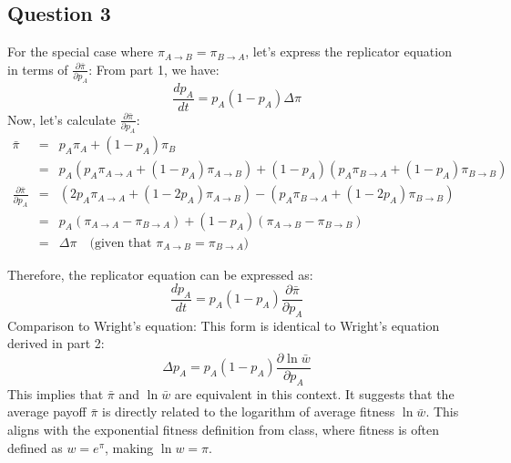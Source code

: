 \documentclass{article}
\begin{document}
\subsection{Question 3}
For the special case where \(\pi_{A \to B} = \pi_{B \to A}\), let's express the replicator equation in terms of \(\frac{\partial \bar{\pi}}{\partial p_A}\):
From part 1, we have:
\[
\frac{dp_A}{dt} = p_A(1-p_A)\Delta\pi
\]
Now, let's calculate \(\frac{\partial \bar{\pi}}{\partial p_A}\):
\[
\begin{array}{rcl}
\bar{\pi} & = & p_A\pi_A + (1-p_A)\pi_B \\
& = & p_A(p_A\pi_{A \to A} + (1-p_A)\pi_{A \to B}) + (1-p_A)(p_A\pi_{B \to A} + (1-p_A)\pi_{B \to B}) \\
\frac{\partial \bar{\pi}}{\partial p_A} & = & (2p_A\pi_{A \to A} + (1-2p_A)\pi_{A \to B}) - (p_A\pi_{B \to A} + (1-2p_A)\pi_{B \to B}) \\
& = & p_A(\pi_{A \to A} - \pi_{B \to A}) + (1-p_A)(\pi_{A \to B} - \pi_{B \to B}) \\
& = & \Delta\pi \quad \text{(given that \(\pi_{A \to B} = \pi_{B \to A}\))}
\end{array}
\]

Therefore, the replicator equation can be expressed as:
\[
\frac{dp_A}{dt} = p_A(1-p_A)\frac{\partial \bar{\pi}}{\partial p_A}
\]
Comparison to Wright's equation:
This form is identical to Wright's equation derived in part 2:
\[
\Delta p_A = p_A(1-p_A)\frac{\partial \ln \bar{w}}{\partial p_A}
\]
This implies that \(\bar{\pi}\) and \(\ln \bar{w}\) are equivalent in this context. It suggests that the average payoff \(\bar{\pi}\) is directly related to the logarithm of average fitness \(\ln \bar{w}\). This aligns with the exponential fitness definition from class, where fitness is often defined as \(w = e^{\pi}\), making \(\ln w = \pi\).
\end{document}
